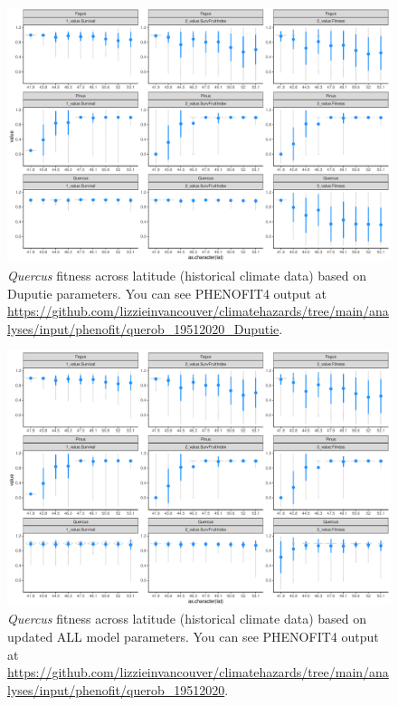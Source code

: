 \documentclass[11pt,letter]{article}
\begin{document}
\begin{figure}[h!]
 \begin{center}
\noindent \includegraphics[width=1\textwidth]{..//analyses/graphs/phenofit/historical/fitnessBuildup_DuputieQuercus.pdf}
  \caption{\emph{Quercus} fitness across latitude (historical climate data) based on Duputie parameters. You can see PHENOFIT4 output at \url{https://github.com/lizzieinvancouver/climatehazards/tree/main/analyses/input/phenofit/querob_19512020_Duputie}.}
  \label{fig:histdup}
  \end{center}
\end{figure}

\begin{figure}[h!]
 \begin{center}
\noindent \includegraphics[width=1\textwidth]{..//analyses/graphs/phenofit/historical/fitnessBuildup.pdf}
  \caption{\emph{Quercus} fitness across latitude (historical climate data) based on updated ALL model parameters. You can see PHENOFIT4 output at \url{https://github.com/lizzieinvancouver/climatehazards/tree/main/analyses/input/phenofit/querob_19512020}.}
  \label{fig:histdnew}
  \end{center}
\end{figure}
\end{document}
